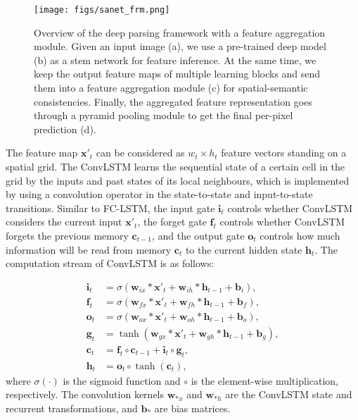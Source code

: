 \documentclass[10pt,twocolumn,twoside]{IEEEtran}
\begin{document}
\begin{figure*}[t!]
\centering
    \texttt{[image: figs/sanet\_frm.png]}   
    \caption{Overview of the deep parsing framework with a feature aggregation module. Given an input image (a), we use a pre-trained deep model (b) as a stem network for feature inference. At the same time, we keep the output feature maps of multiple learning blocks and send them into a feature aggregation module (c) for spatial-semantic consistencies. Finally, the aggregated feature representation goes through a pyramid pooling module to get the final per-pixel prediction (d).}
\label{FIG:FRM}
\end{figure*}

The feature map $\mathbf{x}'_t$ can be considered as $w_t\times h_t$ feature vectors standing on a spatial grid. The ConvLSTM learns the sequential state of a certain cell in the grid by the inputs and past states of its local neighbours, which is implemented by using a convolution operator in the state-to-state and input-to-state transitions. Similar to FC-LSTM, the input gate $\mathbf{i}_t$ controls whether ConvLSTM considers the current input $\mathbf{x}'_t$, the forget gate $\mathbf{f}_t$ controls whether ConvLSTM forgets the previous memory $\mathbf{c}_{t-1}$, and the output gate $\mathbf{o}_t$ controls how much information will be read from memory $\mathbf{c}_t$ to the current hidden state $\mathbf{h}_t$. The computation stream of ConvLSTM is as follows:

\begin{align}
\mathbf{i}_t & = \sigma(\mathbf{w}_{ix}*\mathbf{x}'_t+ \mathbf{w}_{ih}*\mathbf{h}_{t-1}+\mathbf{b}_i),  \\
\mathbf{f}_t & = \sigma(\mathbf{w}_{fx}*\mathbf{x}'_t+\mathbf{w}_{fh}*\mathbf{h}_{t-1}+\mathbf{b}_f), \\
\mathbf{o}_t & = \sigma(\mathbf{w}_{ox}*\mathbf{x}'_t+\mathbf{w}_{oh}*\mathbf{h}_{t-1}+\mathbf{b}_o), \\
\mathbf{g}_t & = \tanh (\mathbf{w}_{gx}*\mathbf{x}'_t+\mathbf{w}_{gh} *\mathbf{h}_{t-1}+\mathbf{b}_g),  \\
\mathbf{c}_t & = \mathbf{f}_t \circ \mathbf{c}_{t-1} + \mathbf{i}_t\circ \mathbf{g}_t,  \\  
\mathbf{h}_t &= \mathbf{o}_t \circ \tanh (\mathbf{c}_t),
\end{align}
where $\sigma(\cdot)$ is the sigmoid function and $\circ$ is the element-wise multiplication, respectively. The convolution kernels $\mathbf{w}_{*x}$ and $\mathbf{w}_{*h}$ are the ConvLSTM state and recurrent transformations, and $\mathbf{b}_*$ are bias matrices.
\end{document}
